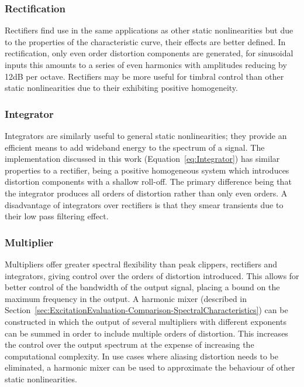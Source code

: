 		\subsubsection*{Rectification}
			Rectifiers find use in the same applications as other static nonlinearities but due to the
			properties of the characteristic curve, their effects are better defined. In rectification, only
			even order distortion components are generated, for sinusoidal inputs this amounts to a series of
			even harmonics with amplitudes reducing by 12dB per octave. Rectifiers may be more useful for
			timbral control than other static nonlinearities due to their exhibiting positive homogeneity.

		\subsubsection*{Integrator}
			Integrators are similarly useful to general static nonlinearities; they provide an efficient means
			to add wideband energy to the spectrum of a signal. The implementation discussed in this work
			(Equation~\ref{eq:Integrator}) has similar properties to a rectifier, being a positive homogeneous
			system which introduces distortion components with a shallow roll-off. The primary difference being
			that the integrator produces all orders of distortion rather than only even orders. A disadvantage
			of integrators over rectifiers is that they smear transients due to their low pass filtering
			effect.

		\subsubsection*{Multiplier}
			Multipliers offer greater spectral flexibility than peak clippers, rectifiers and integrators,
			giving control over the orders of distortion introduced. This allows for better control of the
			bandwidth of the output signal, placing a bound on the maximum frequency in the output. A harmonic
			mixer (described in Section~\ref{sec:ExcitationEvaluation-Comparison-SpectralCharacteristics}) can
			be constructed in which the output of several multipliers with different exponents can be summed in
			order to include multiple orders of distortion. This increases the control over the output spectrum
			at the expense of increasing the computational complexity. In use cases where aliasing distortion
			needs to be eliminated, a harmonic mixer can be used to approximate the behaviour of other static
			nonlinearities.

